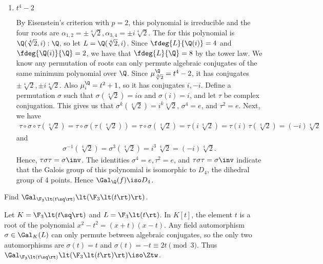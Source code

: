 \documentclass{article}
\begin{document}
\begin{enumerate}
\item $ t^4-2 $
  \begin{solution}
    By Eisenstein's criterion with $ p=2 $, this polynomial is irreducible and the four roots are $ \alpha_{1,2} = \pm\sqrt[4]2, \alpha_{3,4}=\pm i\sqrt[4]2 $.
    The \sfe for this polynomial is $ \Q(\sqrt[4]2,i):\Q $, so let $ L = \Q(\sqrt[4]2, i) $.
    Since $ \fdeg{L}{\Q(i)} = 4 $ and $ \fdeg{\Q(i)}{\Q}=2 $, we have that $ \fdeg{L}{\Q} = 8 $ by the tower law.
    We know any permutation of roots can only permute algebraic conjugates of the same minimum polynomial over $ \Q $.
    Since $ \mu_{\sqrt[4]{2}}^\Q=t^4-2 $, it has conjugates $ \pm\sqrt[4]2,\pm i\sqrt[4]2 $.
    Also $ \mu_i^\Q=t^2+1 $, so it has conjugates $ i,-i $.
    Define a permutation $ \sigma $ such that $ \sigma(\sqrt[4]{2})=i\alpha $ and $ \sigma(i)=i $, and let $ \tau $ be complex conjugation.
    This gives us that $ \sigma^k(\sqrt[4]2) = i^k\sqrt[4]{2} $, $ \sigma^4=e $, and $ \tau^2 = e $.
    Next, we have \begin{align*}
      \tau\circ\sigma\circ\tau(\sqrt[4]{2})=\tau\circ\sigma(\tau(\sqrt[4]{2}))=\tau\circ\sigma(\sqrt[4]{2})=\tau(i\,\sqrt[4]{2})=\tau(i)\,\tau(\sqrt[4]{2})=(-i)\sqrt[4]{2}
    \end{align*}
    and
    \begin{align*}
      \sigma^{-1}(\sqrt[4]{2})=\sigma^3(\sqrt[4]{2})= i^3\,\sqrt[4]{2} = (-i)\sqrt[4]{2}.
    \end{align*}
    Hence, $ \tau\sigma\tau = \sigma\inv $.
    The identities $ \sigma^4 = e,\tau^2 = e $, and $ \tau\sigma\tau = \sigma\inv $ indicate that the Galois group of this polynomial is isomorphic to $ D_4 $, the dihedral group of 4 points.
    Hence $ \Gal_\Q(f) \iso D_4 $.
  \end{solution}
\end{enumerate}

\begin{subexercise}
  Find $ \Gal_{\F_3\lt(t\sq\rt)}\lt(\F_3\lt(t\rt)\rt) $.
\end{subexercise}
\begin{solution}
  Let $ K = \F_3\lt(t\sq\rt)$ and $ L = \F_3\lt(t\rt) $.
  In $ K[t] $, the element $ t $ is a root of the polynomial $ x^2-t^2 = (x+t)(x-t) $.
  Any field automorphism $ \sigma\in \Gal_K(L) $ can only permute between algebraic conjugates, so the only two automorphisms are $ \sigma(t) = t $ and $ \sigma(t) = -t \equiv 2t \pmod 3 $.
  Thus $ \Gal_{\F_3\lt(t\sq\rt)}\lt(\F_3\lt(t\rt)\rt) \iso \Ztw $.
\end{solution}
\end{document}
